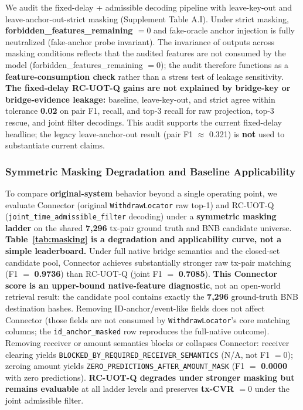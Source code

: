 We audit the fixed-delay + admissible decoding pipeline with leave-key-out and leave-anchor-out-strict masking (Supplement Table A.I). Under strict masking, \textbf{forbidden\_features\_remaining $= 0$} and fake-oracle anchor injection is fully neutralized (fake-anchor probe invariant). The invariance of outputs across masking conditions reflects that the audited features are not consumed by the model (forbidden\_features\_remaining $=0$); the audit therefore functions as a \textbf{feature-consumption check} rather than a stress test of leakage sensitivity. \textbf{The fixed-delay RC-UOT-Q gains are not explained by bridge-key or bridge-evidence leakage:} baseline, leave-key-out, and strict agree within tolerance \textbf{0.02} on pair F1, recall, and top-3 recall for raw projection, top-3 rescue, and joint filter decodings. This audit supports the current fixed-delay headline; the legacy leave-anchor-out result (pair F1 $\approx$ 0.321) is \textbf{not} used to substantiate current claims.

\subsubsection{Symmetric Masking Degradation and Baseline Applicability}
\label{sec:maskingladder}

To compare \textbf{original-system} behavior beyond a single operating point, we evaluate Connector (original \texttt{WithdrawLocator} raw top-1) and RC-UOT-Q (\texttt{joint\_time\_admissible\_filter} decoding) under a \textbf{symmetric masking ladder} on the shared \textbf{7{,}296} tx-pair ground truth and BNB candidate universe. \textbf{Table~\ref{tab:masking} is a degradation and applicability curve, not a simple leaderboard.} Under full native bridge semantics and the closed-set candidate pool, Connector achieves substantially stronger raw tx-pair matching (F1 $=$ \textbf{0.9736}) than RC-UOT-Q (joint F1 $=$ \textbf{0.7085}). \textbf{This Connector score is an upper-bound native-feature diagnostic}, not an open-world retrieval result: the candidate pool contains exactly the \textbf{7{,}296} ground-truth BNB destination hashes. Removing ID-anchor/event-like fields does not affect Connector (those fields are not consumed by \texttt{WithdrawLocator}'s core matching columns; the \texttt{id\_anchor\_masked} row reproduces the full-native outcome). Removing receiver or amount semantics blocks or collapses Connector: receiver clearing yields \texttt{BLOCKED\_BY\_REQUIRED\_RECEIVER\_SEMANTICS} (N/A, not F1 $=0$); zeroing amount yields \texttt{ZERO\_PREDICTIONS\_AFTER\_AMOUNT\_MASK} (F1 $=$ \textbf{0.0000} with zero predictions). \textbf{RC-UOT-Q degrades under stronger masking but remains evaluable} at all ladder levels and preserves \textbf{tx-CVR $= 0$} under the joint admissible filter.


